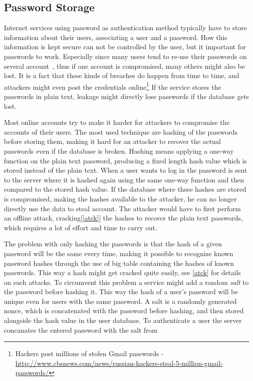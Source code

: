 \subsection{Password Storage}\label{pw-storage}
Internet services using password as authentication method typically have to store information about their users, associating a user and a password. How this information is kept secure can not be controlled by the user, but it important for passwords to work. Especially since many users tend to re-use their passwords on several account~\cite{domino-effect}, thus if one account is compromised, many others might also be lost. It is a fact that these kinds of breaches do happen from time to time, and attackers might even post the credentials online\footnote{Hackers post millions of stolen Gmail passwords - \url{http://www.cbsnews.com/news/russian-hackers-steal-5-million-gmail-passwords/} } If the service stores the passwords in plain text, leakage might directly lose passwords if the database gets lost.
\par Most online accounts try to make it harder for attackers to compromise the accounts of their users. The most used technique are hashing of the passwords before storing them, making it hard for an attacker to recover the actual passwords even if the database is broken. Hashing means applying a one-way function on the plain text password, producing a fixed length hash value which is stored instead of the plain text. When a user wants to log in the password is sent to the server where it is hashed again using the same one-way function and then compared to the stored hash value. If the database where these hashes are stored is compromised, making the hashes available to the attacker, he can no longer directly use the data to steal account. The attacker would have to first perform an offline attack, cracking[\autoref{atck}] the hashes to recover the plain text passwords, which requires a lot of effort and time to carry out. 
\par The problem with only hashing the passwords is that the hash of a given password will be the same every time, making it possible to recognize known password hashes through the use of big table containing the hashes of known passwords. This way a hash might get cracked quite easily, see \autoref{atck} for details on such attacks. To circumvent this problem a service might add a random \emph{salt} to the password before hashing it. This way the hash of a user's password will be unique even for users with the same password. A salt is a randomly generated nonce, which is concatenated with the password before hashing, and then stored alongside the hash value in the user database. To authenticate a user the server concanates the entered password with the salt from 

